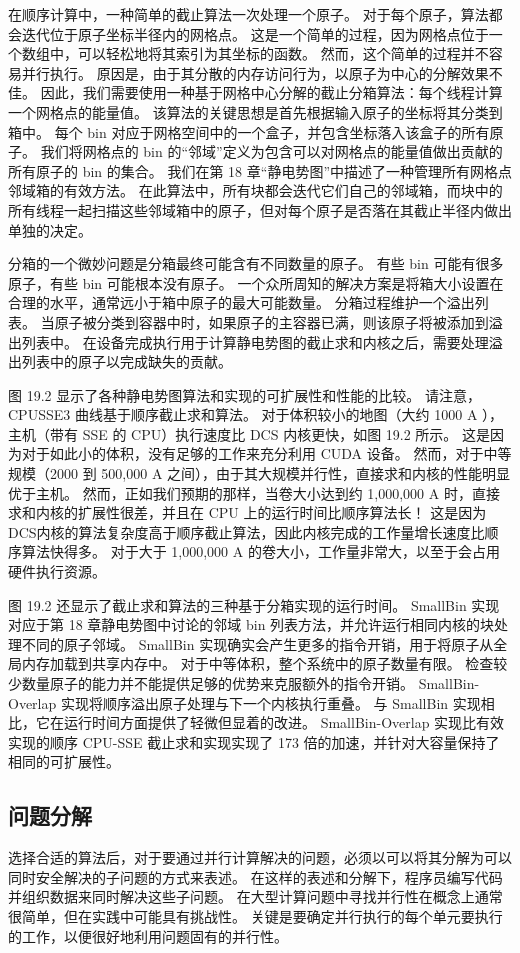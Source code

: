 在顺序计算中，一种简单的截止算法一次处理一个原子。 对于每个原子，算法都会迭代位于原子坐标半径内的网格点。 这是一个简单的过程，因为网格点位于一个数组中，可以轻松地将其索引为其坐标的函数。 然而，这个简单的过程并不容易并行执行。 原因是，由于其分散的内存访问行为，以原子为中心的分解效果不佳。 因此，我们需要使用一种基于网格中心分解的截止分箱算法：每个线程计算一个网格点的能量值。 该算法的关键思想是首先根据输入原子的坐标将其分类到箱中。 每个 bin 对应于网格空间中的一个盒子，并包含坐标落入该盒子的所有原子。 我们将网格点的 bin 的“邻域”定义为包含可以对网格点的能量值做出贡献的所有原子的 bin 的集合。 我们在第 18 章“静电势图”中描述了一种管理所有网格点邻域箱的有效方法。 在此算法中，所有块都会迭代它们自己的邻域箱，而块中的所有线程一起扫描这些邻域箱中的原子，但对每个原子是否落在其截止半径内做出单独的决定。

分箱的一个微妙问题是分箱最终可能含有不同数量的原子。 有些 bin 可能有很多原子，有些 bin 可能根本没有原子。 一个众所周知的解决方案是将箱大小设置在合理的水平，通常远小于箱中原子的最大可能数量。 分箱过程维护一个溢出列表。 当原子被分类到容器中时，如果原子的主容器已满，则该原子将被添加到溢出列表中。 在设备完成执行用于计算静电势图的截止求和内核之后，需要处理溢出列表中的原子以完成缺失的贡献。

图 19.2 显示了各种静电势图算法和实现的可扩展性和性能的比较。 请注意，CPUSSE3 曲线基于顺序截止求和算法。 对于体积较小的地图（大约 1000 A ），主机（带有 SSE 的 CPU）执行速度比 DCS 内核更快，如图 19.2 所示。 这是因为对于如此小的体积，没有足够的工作来充分利用 CUDA 设备。 然而，对于中等规模（2000 到 500,000 A 之间），由于其大规模并行性，直接求和内核的性能明显优于主机。 然而，正如我们预期的那样，当卷大小达到约 1,000,000 A 时，直接求和内核的扩展性很差，并且在 CPU 上的运行时间比顺序算法长！ 这是因为DCS内核的算法复杂度高于顺序截止算法，因此内核完成的工作量增长速度比顺序算法快得多。 对于大于 1,000,000 A 的卷大小，工作量非常大，以至于会占用硬件执行资源。

图 19.2 还显示了截止求和算法的三种基于分箱实现的运行时间。 SmallBin 实现对应于第 18 章静电势图中讨论的邻域 bin 列表方法，并允许运行相同内核的块处理不同的原子邻域。 SmallBin 实现确实会产生更多的指令开销，用于将原子从全局内存加载到共享内存中。 对于中等体积，整个系统中的原子数量有限。 检查较少数量原子的能力并不能提供足够的优势来克服额外的指令开销。 SmallBin-Overlap 实现将顺序溢出原子处理与下一个内核执行重叠。 与 SmallBin 实现相比，它在运行时间方面提供了轻微但显着的改进。 SmallBin-Overlap 实现比有效实现的顺序 CPU-SSE 截止求和实现实现了 173 倍的加速，并针对大容量保持了相同的可扩展性。

\subsection{问题分解}
选择合适的算法后，对于要通过并行计算解决的问题，必须以可以将其分解为可以同时安全解决的子问题的方式来表述。 在这样的表述和分解下，程序员编写代码并组织数据来同时解决这些子问题。 在大型计算问题中寻找并行性在概念上通常很简单，但在实践中可能具有挑战性。 关键是要确定并行执行的每个单元要执行的工作，以便很好地利用问题固有的并行性。

